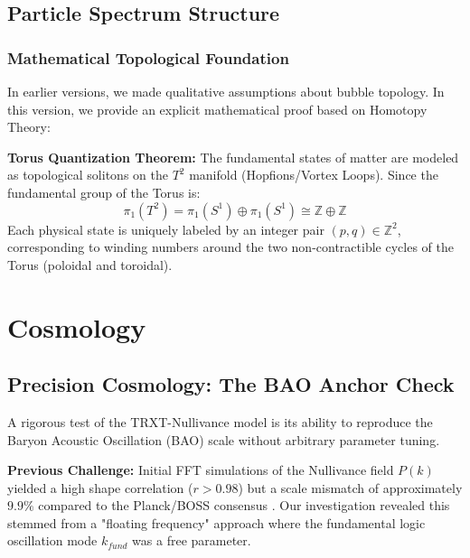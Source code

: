 \documentclass[a4paper,12pt]{article}
\begin{document}
\subsection{Particle Spectrum Structure}

\subsubsection{Mathematical Topological Foundation}
In earlier versions, we made qualitative assumptions about bubble topology. In this version, we provide an explicit mathematical proof based on Homotopy Theory:

\textbf{Torus Quantization Theorem:}
The fundamental states of matter are modeled as topological solitons on the $T^2$ manifold (Hopfions/Vortex Loops). Since the fundamental group of the Torus is:
\begin{equation}
 \pi_1(T^2) = \pi_1(S^1) \oplus \pi_1(S^1) \cong \mathbb{Z} \oplus \mathbb{Z}
\end{equation}
Each physical state is uniquely labeled by an integer pair $(p,q) \in \mathbb{Z}^2$, corresponding to winding numbers around the two non-contractible cycles of the Torus (poloidal and toroidal).


\section{Cosmology} %

\subsection{Precision Cosmology: The BAO Anchor Check}
A rigorous test of the TRXT-Nullivance model is its ability to reproduce the Baryon Acoustic Oscillation (BAO) scale without arbitrary parameter tuning.

\textbf{Previous Challenge:}
Initial FFT simulations of the Nullivance field $P(k)$ yielded a high shape correlation ($r > 0.98$) but a scale mismatch of approximately $9.9\%$ compared to the Planck/BOSS consensus \cite{planck, boss}.
Our investigation revealed this stemmed from a "floating frequency" approach where the fundamental logic oscillation mode $k_{fund}$ was a free parameter.
\end{document}
